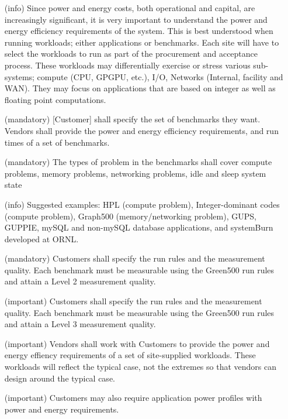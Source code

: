 \begin{itemize}

\item[(info)]
Since power and energy costs, both operational and capital, are increasingly significant, it is very important to understand the power and energy efficiency requirements of the system.  This is best understood when running workloads; either applications or benchmarks.  Each site will have to select the workloads to run as part of the procurement and acceptance process.  These workloads may differentially exercise or stress various sub-systems; compute (CPU, GPGPU, etc.), I/O, Networks (Internal, facility and WAN).  They may focus on applications that are based on integer as well as floating point computations.

\item[(mandatory)]
[Customer] shall specify the set of benchmarks they want. Vendors shall provide the power and energy efficiency requirements, and run times of a set of benchmarks. 

\item[(mandatory)]
The types of problem in the benchmarks shall cover compute problems, memory problems, networking problems, idle and sleep system state

\item[(info)]
Suggested examples: HPL (compute problem), Integer-dominant codes (compute problem), Graph500 (memory/networking problem), GUPS, GUPPIE,  mySQL and non-mySQL database applications, and systemBurn developed at ORNL. 

\item[(mandatory)]
Customers shall specify the run rules and the measurement quality. Each benchmark must be measurable using the Green500 run rules and attain a Level 2 measurement quality. 

\item[(important)]
Customers shall specify the run rules and the measurement quality. Each benchmark must be measurable using the Green500 run rules and attain a Level 3 measurement quality. 

\item[(important)]
Vendors shall work with Customers to provide the power and energy effiency requirements of a set of site-supplied workloads. These workloads will reflect the typical case, not the extremes so that vendors can design around the typical case. 

\item[(important)]
Customers may also require application power profiles with power and energy requirements.
\end{itemize}

